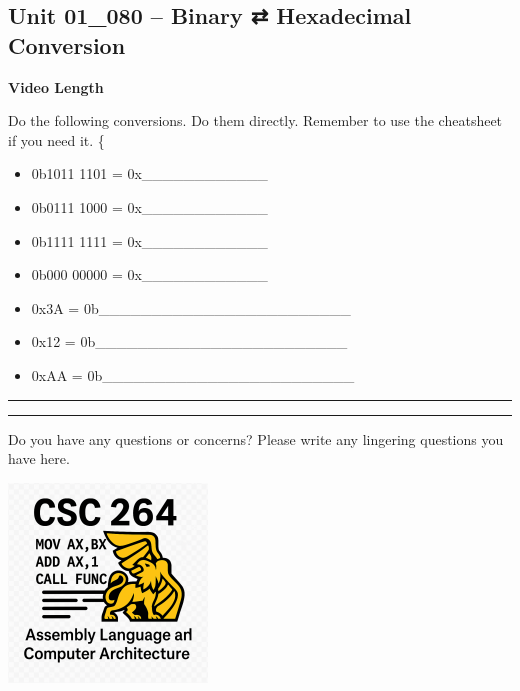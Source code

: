 \documentclass[letterpaper,12pt]{exam}
\newcommand{\unit}{Unit 01}
\begin{document}
\begin{questions}
\section*{\unit\_080 -- Binary ⇄ Hexadecimal Conversion}
\par{\selectfont\textbf{Video Length }}
\begin{samepage}
    \question Do the following conversions.  Do them directly.  Remember to use the cheatsheet if you need it.
    \{\begin{itemize}
      \item  0b1011 1101 = 0x\_\_\_\_\_\_\_\_\_\_\_\_\\
      \item  0b0111 1000 = 0x\_\_\_\_\_\_\_\_\_\_\_\_\\
      \item  0b1111 1111 = 0x\_\_\_\_\_\_\_\_\_\_\_\_\\
      \item  0b000 00000 = 0x\_\_\_\_\_\_\_\_\_\_\_\_
      \item  0x3A = 0b\_\_\_\_\_\_\_\_\_\_\_\_\_\_\_\_\_\_\_\_\_\_\_\_\\
      \item  0x12 = 0b\_\_\_\_\_\_\_\_\_\_\_\_\_\_\_\_\_\_\_\_\_\_\_\_\\
      \item  0xAA = 0b\_\_\_\_\_\_\_\_\_\_\_\_\_\_\_\_\_\_\_\_\_\_\_\_\\
    \end{itemize}
\end{samepage}

\rule{0.5\textwidth}{.4pt} %
\begin{center}
    \rule{0.5\textwidth}{.4pt}
\end{center}
Do you have any questions or concerns? Please write any lingering questions you have here.

\end{questions}
\vfill
\begin{center}
\includegraphics{../csc264Logo}
\end{center}
\end{document}
